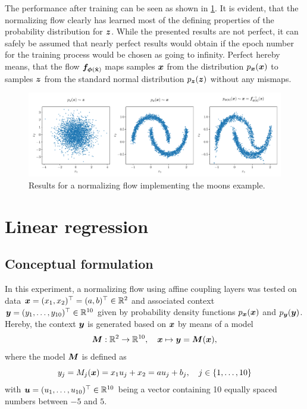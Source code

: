 \documentclass[a4paper,12pt]{report}
\begin{document}
The performance after training can be seen as shown in \cref{fig:nf-moons-example-plots}. It is evident, that the normalizing flow clearly has learned most of the defining properties of the probability distribution for $\bm{z}$. While the presented results are not perfect, it can safely be assumed that nearly perfect results would obtain if the epoch number for the training process would be chosen as going to infinity. Perfect hereby means, that the flow $\bm{f}_{\bm{\phi}(\hat{\boldsymbol{\mathbf{x}}})}$ maps samples $\bm{x}$ from the distribution $p_{\bm{x}}(\bm{x})$ to samples $\bm{z}$ from the standard normal distribution $p_{\bm{z}}(\bm{z})$ without any mismaps.
\begin{figure}[h!]
\centering
\includegraphics[width=\textwidth]{figures/nf-moons-example-plots.pdf}
\caption{Results for a normalizing flow implementing the moons example.}
\label{fig:nf-moons-example-plots}
\end{figure}

\FloatBarrier
\section{Linear regression}
\subsection{Conceptual formulation}
In this experiment, a normalizing flow using affine coupling layers was tested on data $\bm{x}=(x_1,x_2)^\top = (a,b)^\top \in \mathbb{R}^2$ and associated context $\bm{y}=(y_1,\dots,y_{10})^\top \in \mathbb{R}^{10}$ given by probability density functions $p_{\bm{x}}(\bm{x})$ and $p_{\bm{y}}(\bm{y})$. Hereby, the context $\bm{y}$ is generated based on $\bm{x}$ by means of a model
\begin{equation}\label{eq:linearmodellinregr}
\bm{M}:\mathbb{R}^2 \rightarrow \mathbb{R}^{10}, \quad \bm{x}\mapsto \bm{y} = \bm{M}(\bm{x}),
\end{equation} where the model $\bm{M}$ is defined as \begin{equation}
y_j = M_j(\bm{x}) = x_1 u_j + x_2 = a u_j + b_j, \quad j \in \{1,\dots,10\}
\end{equation} with $\bm{u} = (u_1,\dots,u_{10})^\top \in \mathbb{R}^{10}$ being a vector containing 10 equally spaced numbers between $-5$ and $5$.
\end{document}
